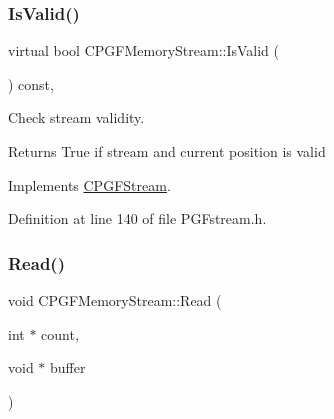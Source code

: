 \begin{DoxyCode}{0}

\end{DoxyCode}
\mbox{\label{classCPGFMemoryStream_a5eb1f2ee69815d63fa764b100d883655}} 
\subsubsection{\texorpdfstring{IsValid()}{IsValid()}}
{\footnotesize\ttfamily virtual bool C\+P\+G\+F\+Memory\+Stream\+::\+Is\+Valid (\begin{DoxyParamCaption}{ }\end{DoxyParamCaption}) const\hspace{0.3cm}{\ttfamily [inline]}, {\ttfamily [virtual]}}

Check stream validity. \begin{DoxyReturn}{Returns}
True if stream and current position is valid 
\end{DoxyReturn}


Implements \mbox{\hyperlink{classCPGFStream_abf99169c9bcf0feb57edc55cec215b95}{C\+P\+G\+F\+Stream}}.



Definition at line 140 of file P\+G\+Fstream.\+h.


\begin{DoxyCode}{0}

\end{DoxyCode}
\mbox{\label{classCPGFMemoryStream_a4cf0499309d901fcdcd9282a7351d24d}} 
\subsubsection{\texorpdfstring{Read()}{Read()}}
{\footnotesize\ttfamily void C\+P\+G\+F\+Memory\+Stream\+::\+Read (\begin{DoxyParamCaption}\item[{int $\ast$}]{count,  }\item[{void $\ast$}]{buffer }\end{DoxyParamCaption})\hspace{0.3cm}{\ttfamily [virtual]}}


